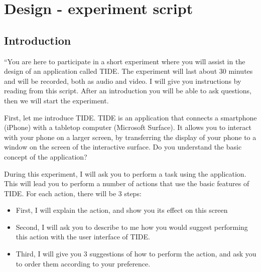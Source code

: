 
\chapter{Design - experiment script}
\label{app:study}

\tightlists

\section{Introduction}
``You are here to participate in a short experiment where you will assist in the design of an application called TIDE.
The experiment will last about 30 minutes and will be recorded, both as audio and video.
I will give you instructions by reading from this script.
After an introduction you will be able to ask questions, then we will start the experiment.

First, let me introduce TIDE.
TIDE is an application that connects a smartphone (iPhone) with a tabletop computer (Microsoft Surface).
It allows you to interact with your phone on a larger screen, by transferring the display of your phone to a window on the screen of the interactive surface.
Do you understand the basic concept of the application?

During this experiment, I will ask you to perform a task using the application.
This will lead you to perform a number of actions that use the basic features of TIDE.
For each action, there will be 3 steps:

\begin{itemize}
\item{First, I will explain the action, and show you its effect on this screen}
\item{Second, I will ask you to describe to me how you would suggest performing this action with the user interface of TIDE.}
\item{Third, I will give you 3 suggestions of how to perform the action, and ask you to order them according to your preference.}
\end{itemize}


